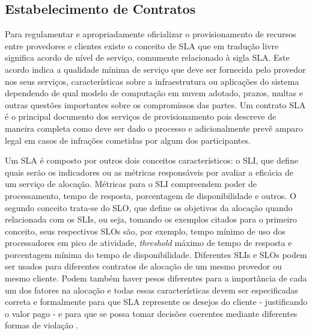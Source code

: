 \subsection{Estabelecimento de Contratos}
\label{subsec:nuvem_sla:estabelecimento_contratos}
%
Para regulamentar e apropriadamente oficializar o provisionamento de recursos entre provedores e clientes existe o conceito de \ac{SLA} que em tradução livre significa acordo de nível de serviço, comumente relacionado à sigla \ac{SLA}. 
%
Este acordo indica a qualidade mínima de serviço que deve ser fornecida pelo provedor nos seus serviços, características sobre a infraestrutura ou aplicações do sistema dependendo de qual modelo de computação em nuvem adotado, prazos, multas e outras questões importantes sobre os compromissos das partes. 
%
Um contrato \ac{SLA} é o principal documento dos serviços de provisionamento pois descreve de maneira completa como deve ser dado o processo e adicionalmente prevê amparo legal em casos de infrações cometidas por algum dos participantes.

%
Um \ac{SLA} é composto por outros dois conceitos característicos: o \ac{SLI}, que define quais serão os indicadores ou as métricas responsáveis por avaliar a eficácia de um serviço de alocação. Métricas para o \ac{SLI} compreendem poder de processamento, tempo de resposta, porcentagem de disponibilidade e outros. O segundo conceito trata-se do \ac{SLO}, que define os objetivos da alocação quando relacionada com os \acp{SLI}, ou seja, tomando os exemplos citados para o primeiro conceito, seus respectivos \acp{SLO} são, por exemplo, tempo mínimo de uso dos processadores em pico de atividade, \textit{threshold} máximo de tempo de resposta e porcentagem mínima do tempo de disponibilidade. Diferentes \acp{SLI} e \acp{SLO} podem ser usados para diferentes contratos de alocação de um mesmo provedor ou mesmo cliente. Podem também haver pesos diferentes para a importância de cada um dos fatores na alocação e todas essas características devem ser especificadas correta e formalmente para que \ac{SLA} represente os desejos do cliente - justificando o valor pago - e para que se possa tomar decisões coerentes mediante diferentes formas de violação \cite{nuvem_sla:sauve_sli_slo}.

